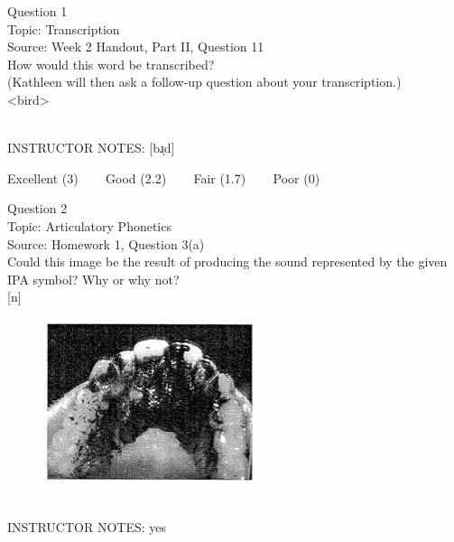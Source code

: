 \documentclass[12pt]{article}
\begin{document}
\begin{center}
\textbf{{\color{blue}{\HUGE START OF EXAM\\}}}

\textbf{{\color{blue}{\HUGE Student ID: 19086\\}}}

\textbf{{\color{blue}{\HUGE \\}}}

\end{center}
\newpage

{\large Question 1}\\

Topic: Transcription\\
Source: Week 2 Handout, Part II, Question 11\\

How would this word be transcribed?\\ (Kathleen will then ask a follow-up question about your transcription.)\\

<bird>


~\\
INSTRUCTOR NOTES: [bɹ̩d]


\vfill
Excellent (3) ~~~ Good (2.2) ~~~ Fair (1.7) ~~~ Poor (0)
\newpage

{\large Question 2}\\

Topic: Articulatory Phonetics\\
Source: Homework 1, Question 3(a)\\

Could this image be the result of producing the sound represented by the given IPA symbol? Why or why not?\\

{[n]}

\begin{figure}[H]
\includegraphics{../images/staticpalatography_stop.png}
\end{figure}

~\\
INSTRUCTOR NOTES: yes
\end{document}
